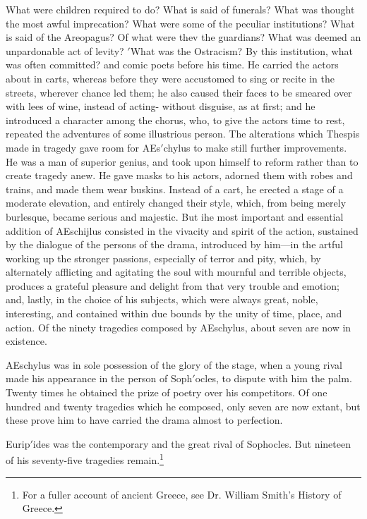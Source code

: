 \documentclass[openany,a4paper]{memoir}
\begin{document}
What were children required to do? What is said of funerals? 
What was thought the most awful imprecation? What were some of 
the peculiar institutions? What is said of the Areopagus? Of what 
were thev the guardians? What was deemed an unpardonable act of 
levity? $'$What was the Ostracism? By this institution, what was often 
committed? 
and comic poets before his time. He carried the actors 
about in carts, whereas before they were accustomed to sing 
or recite in the streets, wherever chance led them; he also 
caused their faces to be smeared over with lees of wine, instead of acting- without disguise, as at first; and he introduced a character among the chorus, who, to give the actors 
time to rest, repeated the adventures of some illustrious 
person. The alterations which Thespis made in tragedy 
gave room for AEs$'$chylus to make still further improvements. He was a man of superior genius, and took upon 
himself to reform rather than to create tragedy anew. He 
gave masks to his actors, adorned them with robes and 
trains, and made them wear buskins. Instead of a cart, he 
erected a stage of a moderate elevation, and entirely changed 
their style, which, from being merely burlesque, became 
serious and majestic. But ihe most important and essential 
addition of AEschijlus consisted in the vivacity and spirit of 
the action, sustained by the dialogue of the persons of the 
drama, introduced by him---in the artful working up the 
stronger passions, especially of terror and pity, which, by 
alternately afflicting and agitating the soul with mournful 
and terrible objects, produces a grateful pleasure and delight 
from that very trouble and emotion; and, lastly, in the 
choice of his subjects, which were always great, noble, interesting, and contained within due bounds by the unity of 
time, place, and action. Of the ninety tragedies composed 
by AEschylus, about seven are now in existence. 

AEschylus was in sole possession of the glory of the stage, 
when a young rival made his appearance in the person of 
Soph$'$ocles, to dispute with him the palm. Twenty times he 
obtained the prize of poetry over his competitors. Of one 
hundred and twenty tragedies which he composed, only seven 
are now extant, but these prove him to have carried the drama 
almost to perfection. 

Eurip$'$ides was the contemporary and the great rival of 
Sophocles. But nineteen of his seventy-five tragedies remain.\footnote{For a fuller account of ancient Greece, see Dr. William Smith's 
History of Greece.}
\end{document}

